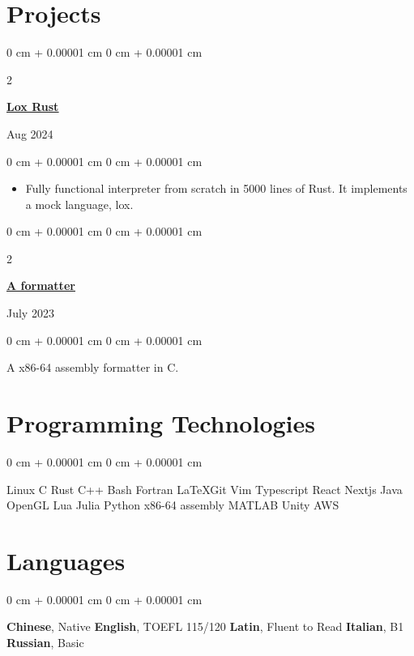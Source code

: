 \documentclass[10pt, a4paper]{article}
\newenvironment{highlights}{
    \begin{itemize}[
        topsep=0.10 cm,
        parsep=0.10 cm,
        partopsep=0pt,
        itemsep=0pt,
        leftmargin=0 cm + 10pt
    ]
}{
    \end{itemize}
} %
\newenvironment{onecolentry}{
    \begin{adjustwidth}{
        0 cm + 0.00001 cm
    }{
        0 cm + 0.00001 cm
    }
}{
    \end{adjustwidth}
} %
\newenvironment{twocolentry}[2][]{
    \onecolentry
    \def\secondColumn{#2}
    \setcolumnwidth{\fill, 4.5 cm}
    \begin{paracol}{2}
}{
    \switchcolumn \raggedleft \secondColumn
    \end{paracol}
    \endonecolentry
} %
\begin{document}
    
    \section{Projects}

        \begin{twocolentry}{
            Aug 2024
		}
		\href{https://github.com/harryhanYuhao/lox-rust.git}{\underline{\textbf{Lox Rust}}}
		\end{twocolentry}
        \vspace{0.10 cm}
        \begin{onecolentry}
            \begin{highlights}
                \item Fully functional interpreter from scratch in 5000 lines of Rust.
				It implements a mock language, lox.
            \end{highlights}
        \end{onecolentry}

        \vspace{0.15 cm}

        \begin{twocolentry}{
				July 2023
        }
		\href{https://github.com/harryhanYuhao/aformatter}{\underline{\textbf{A formatter}}}
		\end{twocolentry}
        \vspace{0.10 cm}
        \begin{onecolentry}
			A x86-64 assembly formatter in C.
        \end{onecolentry}


	\section{Programming Technologies}
        \begin{onecolentry}
			Linux \textbullet{} C \textbullet{} Rust \textbullet{} C++ \textbullet{} Bash \textbullet{} Fortran \textbullet{} \LaTeX \textbullet Git \textbullet Vim \textbullet Typescript \textbullet React \textbullet Nextjs \textbullet Java
			OpenGL \textbullet Lua \textbullet{} Julia \textbullet Python \textbullet{} x86-64 assembly \textbullet{} MATLAB \textbullet{} Unity \textbullet AWS

        \end{onecolentry}

        \vspace{0.2 cm}

	\section{Languages}
	\begin{onecolentry}
		\textbf{Chinese}, Native
		\textbullet{} 
		\textbf{English}, TOEFL 115/120 
		\textbullet{} 
		\textbf{Latin}, Fluent to Read
		\textbullet{} 
		\textbf{Italian}, B1
		\textbullet{}
		\textbf{Russian}, Basic 
	\end{onecolentry}
\end{document}
